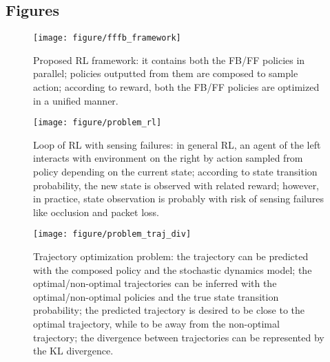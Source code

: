 \documentclass{bmcart}
\begin{document}
\begin{backmatter}



\clearpage
\section*{Figures}

\begin{figure}[!ht]
    \centering
    \texttt{[image: figure/fffb\_framework]}
    \caption{Proposed RL framework:
    it contains both the FB/FF policies in parallel;
    policies outputted from them are composed to sample action;
    according to reward, both the FB/FF policies are optimized in a unified manner.
    }
    \label{fig:fffb_framework}
\end{figure}

\begin{figure}[!ht]
    \centering
    \texttt{[image: figure/problem\_rl]}
    \caption{Loop of RL with sensing failures:
    in general RL, an agent of the left interacts with environment on the right by action sampled from policy depending on the current state;
    according to state transition probability, the new state is observed with related reward;
    however, in practice, state observation is probably with risk of sensing failures like occlusion and packet loss.
    }
    \label{fig:problem_rl}
\end{figure}

\begin{figure}[!ht]
    \centering
    \texttt{[image: figure/problem\_traj\_div]}
    \caption{Trajectory optimization problem:
    the trajectory can be predicted with the composed policy and the stochastic dynamics model;
    the optimal/non-optimal trajectories can be inferred with the optimal/non-optimal policies and the true state transition probability;
    the predicted trajectory is desired to be close to the optimal trajectory, while to be away from the non-optimal trajectory;
    the divergence between trajectories can be represented by the KL divergence.
    }
    \label{fig:problem_traj_div}
\end{figure}


\end{backmatter}
\end{document}

